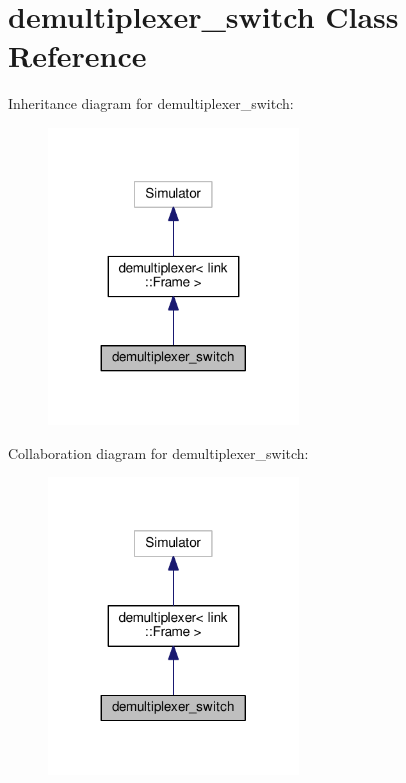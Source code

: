 \hypertarget{classdemultiplexer__switch}{}\section{demultiplexer\+\_\+switch Class Reference}
\label{classdemultiplexer__switch}


Inheritance diagram for demultiplexer\+\_\+switch\+:\nopagebreak
\begin{figure}[H]
\begin{center}
\leavevmode
\includegraphics[width=188pt]{classdemultiplexer__switch__inherit__graph}
\end{center}
\end{figure}


Collaboration diagram for demultiplexer\+\_\+switch\+:\nopagebreak
\begin{figure}[H]
\begin{center}
\leavevmode
\includegraphics[width=188pt]{classdemultiplexer__switch__coll__graph}
\end{center}
\end{figure}
